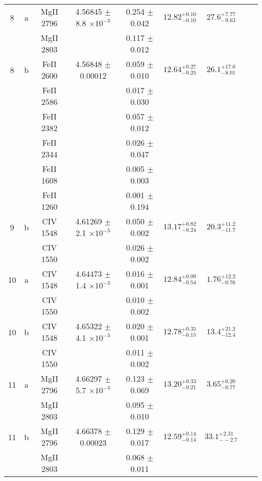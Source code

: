 \documentclass[12pt]{article}
\begin{document}
\begin{footnotesize}
\begin{longtable}{ c c c c c c c c c}
       8  & a  & MgII     2796  &  4.56845 $\pm$ 8.8 $\times 10^{-5}$   &  0.254 $\pm$ 0.042   & $12.82_{ - 0.10}^{ + 0.10}$  & $27.6_{ - 9.63}^{ + 7.77}$    & 	 & \\ 
  &   & MgII     2803  &  &  0.117 $\pm$ 0.012   &   &     & 	 & \\ 
       8  & b  & FeII     2600  &  4.56848 $\pm$ 0.00012  &  0.059 $\pm$ 0.010   & $12.64_{ - 0.25}^{ + 0.27}$  & $26.1_{ - 8.01}^{ + 17.0}$    & 	 & \\ 
  &   & FeII     2586  &  &  0.017 $\pm$ 0.030   &   &     & 	 & \\ 
  &   & FeII     2382  &  &  0.057 $\pm$ 0.012   &   &     & 	 & \\ 
  &   & FeII     2344  &  &  0.026 $\pm$ 0.047   &   &     & 	 & \\ 
  &   & FeII     1608  &  &  0.005 $\pm$ 0.003   &   &     & 	 & \\ 
  &   & FeII     1260  &  &  0.001 $\pm$ 0.194   &   &     & 	 & \\ 
       9  & b  & CIV     1548  &  4.61269 $\pm$ 2.1 $\times 10^{-5}$   &  0.050 $\pm$ 0.002   & $13.17_{ - 0.24}^{ + 0.82}$  & $20.3_{ - 11.7}^{ + 11.2}$    & 	 & \\ 
  &   & CIV     1550  &  &  0.026 $\pm$ 0.002   &   &     & 	 & \\ 
      10  & a  & CIV     1548  &  4.64473 $\pm$ 1.4 $\times 10^{-5}$   &  0.016 $\pm$ 0.001   & $12.84_{ - 0.54}^{ + 0.09}$  & $1.76_{ - 0.76}^{ + 12.2}$    & 	 & \\ 
  &   & CIV     1550  &  &  0.010 $\pm$ 0.002   &   &     & 	 & \\ 
      10  & b  & CIV     1548  &  4.65322 $\pm$ 4.1 $\times 10^{-5}$   &  0.020 $\pm$ 0.001   & $12.78_{ - 0.15}^{ + 0.35}$  & $13.4_{ - 12.4}^{ + 21.2}$    & 	 & \\ 
  &   & CIV     1550  &  &  0.011 $\pm$ 0.002   &   &     & 	 & \\ 
      11  & a  & MgII     2796  &  4.66297 $\pm$ 5.7 $\times 10^{-5}$   &  0.123 $\pm$ 0.069   & $13.20_{ - 0.21}^{ + 0.33}$  & $3.65_{ - 0.77}^{ + 0.20}$    & 	 & \\ 
  &   & MgII     2803  &  &  0.095 $\pm$ 0.010   &   &     & 	 & \\ 
      11  & b  & MgII     2796  &  4.66378 $\pm$ 0.00023  &  0.129 $\pm$ 0.017   & $12.59_{ - 0.14}^{ + 0.14}$  & $33.1_{ - -2.7}^{ + 2.31}$    & 	 & \\ 
  &   & MgII     2803  &  &  0.068 $\pm$ 0.011   &   &     & 	 & \\ 

\end{longtable}
\end{footnotesize}
\end{document}
